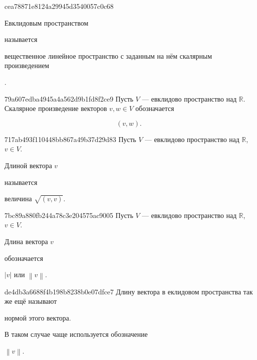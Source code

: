\begin{note}{cea78871e8124a29945d3540057c0c68}
    \begin{icloze}{2}Евклидовым пространством\end{icloze} называется \begin{icloze}{1}вещественное линейное пространство с заданным на нём скалярным произведением\end{icloze}.
\end{note}

\begin{note}{79a607edba4945a4a562d9b1fd8f2ce9}
    Пусть \({ V }\) --- евклидово пространство над \({ \mathbb R }\).
    Скалярное произведение векторов \({ v, w \in V }\) обозначается
    \begin{icloze}{1}
        \[
            (v, w).
        \]
    \end{icloze}
\end{note}

\begin{note}{717ab493f110448bb867a49b37d29d83}
    Пусть \({ V }\) --- евклидово пространство над \({ \mathbb R }\),\: \({ v \in V }\).
    \begin{icloze}{2}Длиной вектора \({ v }\)\end{icloze} называется \begin{icloze}{1}величина \( \sqrt{(v, v)} \).\end{icloze}
\end{note}

\begin{note}{7bc89a880fb244a78c3e204575ac9005}
    Пусть \({ V }\) --- евклидово пространство над \({ \mathbb R }\),\: \({ v \in V }\).
    \begin{icloze}{2}Длина вектора \({ v }\)\end{icloze} обозначается \begin{icloze}{1}\( \left\lvert v \right\rvert \) или \({ \left\lVert v \right\rVert }\).\end{icloze}
\end{note}

\begin{note}{de4db3a6688f4b198b8238b0e07dfce7}
    Длину вектора в еклидовом пространства так же ещё называют \begin{icloze}{1}нормой этого вектора.\end{icloze} В таком случае чаще используется обозначение \begin{icloze}{2}\( \left\lVert v \right\rVert \).\end{icloze}
\end{note}

